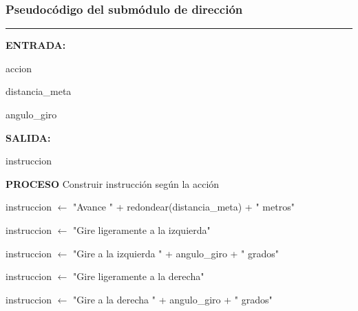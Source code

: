 \subsubsection{Pseudocódigo del submódulo de dirección}

\begin{center}
\label{alg:subdir}
\end{center}
\vspace{-1.8cm}
\rule{\textwidth}{0.4pt}
\vspace{-0.9cm}

\begin{algorithmic}[1]

\Statex \textbf{ENTRADA:}

\Statex accion

\Statex distancia\_meta

\Statex angulo\_giro

\Statex
\Statex \textbf{SALIDA:}

\Statex instruccion

\Statex
\Statex \textbf{PROCESO}
\State Construir instrucción según la acción


    \State instruccion $\gets$
    "Avance " + redondear(distancia\_meta) + " metros"

\EndIf

\Statex



        \State instruccion $\gets$
        "Gire ligeramente a la izquierda"

    \Else

        \State instruccion $\gets$
        "Gire a la izquierda " + angulo\_giro + " grados"

    \EndIf

\EndIf

\Statex



        \State instruccion $\gets$
        "Gire ligeramente a la derecha"

    \Else

        \State instruccion $\gets$
        "Gire a la derecha " + angulo\_giro + " grados"


\end{algorithmic}
